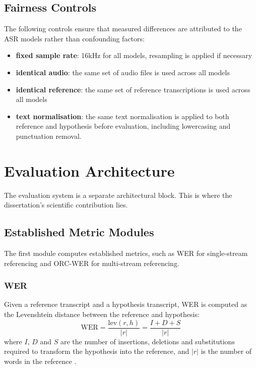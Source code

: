 \subsection{Fairness Controls}
The following controls ensure that measured differences are attributed to the ASR models rather than confounding factors:
\begin{itemize}
    \item \textbf{fixed sample rate}: 16kHz for all models, resampling is applied if necessary
    \item \textbf{identical audio}: the same set of audio files is used across all models
    \item \textbf{identical reference}: the same set of reference transcriptions is used across all models
    \item \textbf{text normalisation}: the same text normalisation is applied to both reference and hypothesis before evaluation, including lowercasing and punctuation removal.
\end{itemize}



\section{Evaluation Architecture}
The evaluation system is a separate architectural block. This is where the dissertation's scientific contribution lies. 
\subsection{Established Metric Modules}
The first module computes established metrics, such as WER for single-stream referencing and ORC-WER for multi-stream referencing. 

\subsubsection{WER}
Given a reference transcript and a hypothesis transcript, WER is computed as the Levenshtein distance between the reference and hypothesis:
\begin{equation}
\mathrm{WER} = \frac{\mathrm{lev}(r,h)}{|r|}=\frac{I + D + S}{|r|}
\end{equation}
where $I$, $D$ and $S$ are the number of insertions, deletions and substitutions required to transform the hypothesis into the reference, and $|r|$ is the number of words in the reference \cite{Word_Error_Rate_Definitions}.

